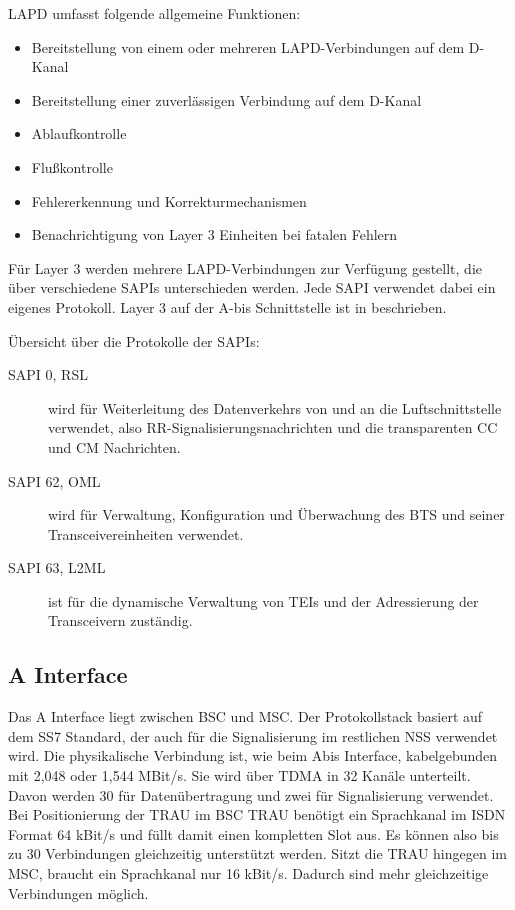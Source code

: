 \ac{LAPD} umfasst folgende allgemeine Funktionen:
\begin{itemize}
\item Bereitstellung von einem oder mehreren \ac{LAPD}-Verbindungen auf dem D-Kanal
\item Bereitstellung einer zuverlässigen Verbindung auf dem D-Kanal
\item Ablaufkontrolle
\item Flußkontrolle
\item Fehlererkennung und Korrekturmechanismen
\item Benachrichtigung von Layer 3 Einheiten bei fatalen Fehlern
\end{itemize}

Für Layer 3 werden mehrere \ac{LAPD}-Verbindungen zur Verfügung gestellt, die über verschiedene \acp{SAPI} unterschieden werden. Jede \ac{SAPI} verwendet dabei ein eigenes Protokoll. Layer 3 auf der A-bis Schnittstelle ist in  beschrieben.

Übersicht über die Protokolle der \acp{SAPI}:
\begin{description}
\item [SAPI 0, \acf{RSL}] wird für Weiterleitung des Datenverkehrs von und an die Luftschnittstelle verwendet, also \ac{RR}-Signalisierungsnachrichten und die transparenten \ac{CC} und \ac{CM} Nachrichten.
\item [SAPI 62, \acf{OML}] wird für Verwaltung, Konfiguration und Überwachung des \ac{BTS} und seiner Transceivereinheiten verwendet.
\item [SAPI 63, \acf{L2ML}] ist für die dynamische Verwaltung von \acp{TEI} und der Adressierung der Transceivern zuständig.
\end{description}

\subsection{A Interface} \label{hdl:a_a_interface}

Das A Interface liegt zwischen \ac{BSC} und \ac{MSC}. Der Protokollstack basiert auf dem \ac{SS7} Standard, der auch für die Signalisierung im restlichen \ac{NSS} verwendet wird. Die physikalische Verbindung ist, wie beim Abis Interface, kabelgebunden mit 2,048 oder 1,544 MBit/s. Sie wird über \ac{TDMA} in 32 Kanäle unterteilt. Davon werden 30 für Datenübertragung und zwei für Signalisierung verwendet. Bei Positionierung der \ac{TRAU} im \ac{BSC} \ac{TRAU} benötigt ein Sprachkanal im \ac{ISDN} Format 64 kBit/s und füllt damit einen kompletten Slot aus. Es können also bis zu 30 Verbindungen gleichzeitig unterstützt werden. Sitzt die \ac{TRAU} hingegen im \ac{MSC}, braucht ein Sprachkanal nur 16 kBit/s. Dadurch sind mehr gleichzeitige Verbindungen möglich. 

